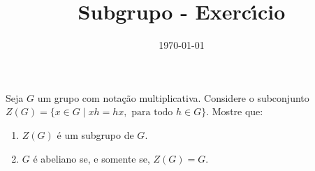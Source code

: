 \documentclass{beamer}
\title{Subgrupo - Exerc{\'\i}cio}
\author[\autor]{\autor}
\institute[\instituto]{\instituto}
\date[]{\today}
\begin{document}


    \begin{frame}
        \begin{exercicio}
            Seja $G$ um grupo com nota\c{c}\~ao multiplicativa. Considere o subconjunto $Z(G) = \{x \in G \mid xh = hx, \mbox{ para todo } h \in G\}$. Mostre que:

            \vspace{.4cm}
            
            \begin{enumerate}[label=({\alph*})]
              \item $Z(G)$ \'e um subgrupo de $G$.

              \vspace{.4cm}

              \item $G$ \'e abeliano se, e somente se, $Z(G) = G$.

              \vspace{.4cm}
              
            \end{enumerate}
        \end{exercicio}
    \end{frame}
\end{document}
